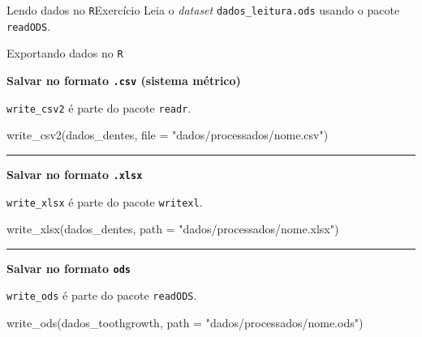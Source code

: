 \documentclass[
  10pt,
  ignorenonframetext,
]{beamer}
\newenvironment{Shaded}{\begin{snugshade}}{\end{snugshade}}
\newcommand{\AttributeTok}[1]{\textcolor[rgb]{0.40,0.45,0.13}{#1}}
\newcommand{\FunctionTok}[1]{\textcolor[rgb]{0.28,0.35,0.67}{#1}}
\newcommand{\NormalTok}[1]{\textcolor[rgb]{0.00,0.23,0.31}{#1}}
\newcommand{\StringTok}[1]{\textcolor[rgb]{0.13,0.47,0.30}{#1}}
\begin{document}
\begin{frame}[fragile]{Lendo dados no \texttt{R}\newline Exercício}
\protect\hypertarget{lendo-dados-no-rexercuxedcio-2}{}
Leia o \emph{dataset} \texttt{dados\_leitura.ods} usando o pacote
\texttt{readODS}.
\end{frame}

\begin{frame}[fragile]{Exportando dados no \texttt{R}}
\protect\hypertarget{exportando-dados-no-r}{}
\small

\textbf{Salvar no formato \texttt{.csv} (sistema métrico)}

\texttt{write\_csv2} é parte do pacote \texttt{readr}.

\begin{Shaded}
\begin{Highlighting}[]
\FunctionTok{write\_csv2}\NormalTok{(dados\_dentes, }\AttributeTok{file =} \StringTok{"dados/processados/nome.csv"}\NormalTok{)}
\end{Highlighting}
\end{Shaded}

\rule{\textwidth}{0.5pt}

\textbf{Salvar no formato \texttt{.xlsx} }

\texttt{write\_xlsx} é parte do pacote \texttt{writexl}.

\begin{Shaded}
\begin{Highlighting}[]
\FunctionTok{write\_xlsx}\NormalTok{(dados\_dentes, }\AttributeTok{path =} \StringTok{"dados/processados/nome.xlsx"}\NormalTok{)}
\end{Highlighting}
\end{Shaded}

\rule{\textwidth}{0.5pt}

\textbf{Salvar no formato \texttt{ods}}

\texttt{write\_ods} é parte do pacote \texttt{readODS}.

\begin{Shaded}
\begin{Highlighting}[]
\FunctionTok{write\_ods}\NormalTok{(dados\_toothgrowth, }\AttributeTok{path =} \StringTok{"dados/processados/nome.ods"}\NormalTok{)}
\end{Highlighting}
\end{Shaded}

\normalsize
\end{frame}
\end{document}
